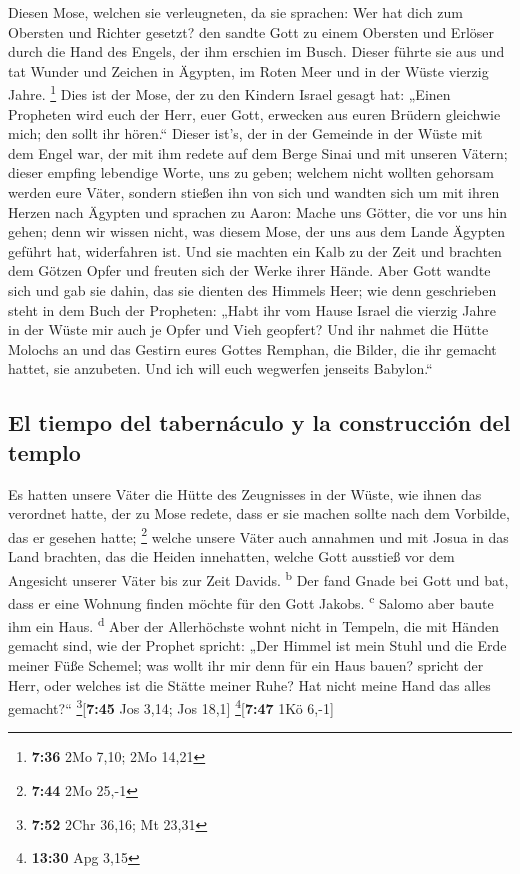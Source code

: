  Diesen Mose, welchen sie verleugneten, da sie sprachen:
Wer hat dich zum Obersten und Richter gesetzt? den sandte Gott zu einem
Obersten und Erlöser durch die Hand des Engels, der ihm erschien im
Busch.  Dieser führte sie aus und tat Wunder und Zeichen
in Ägypten, im Roten Meer und in der Wüste vierzig Jahre. \footnote{\textbf{7:36}
  2Mo 7,10; 2Mo 14,21}  Dies ist der Mose, der zu den
Kindern Israel gesagt hat: „Einen Propheten wird euch der Herr, euer
Gott, erwecken aus euren Brüdern gleichwie mich; den sollt ihr hören.``
 Dieser ist's, der in der Gemeinde in der Wüste mit dem
Engel war, der mit ihm redete auf dem Berge Sinai und mit unseren
Vätern; dieser empfing lebendige Worte, uns zu geben; 
welchem nicht wollten gehorsam werden eure Väter, sondern stießen ihn
von sich und wandten sich um mit ihren Herzen nach Ägypten
 und sprachen zu Aaron: Mache uns Götter, die vor uns hin
gehen; denn wir wissen nicht, was diesem Mose, der uns aus dem Lande
Ägypten geführt hat, widerfahren ist.  Und sie machten
ein Kalb zu der Zeit und brachten dem Götzen Opfer und freuten sich der
Werke ihrer Hände.  Aber Gott wandte sich und gab sie
dahin, das sie dienten des Himmels Heer; wie denn geschrieben steht in
dem Buch der Propheten: „Habt ihr vom Hause Israel die vierzig Jahre in
der Wüste mir auch je Opfer und Vieh geopfert?  Und ihr
nahmet die Hütte Molochs an und das Gestirn eures Gottes Remphan, die
Bilder, die ihr gemacht hattet, sie anzubeten. Und ich will euch
wegwerfen jenseits Babylon.``

\hypertarget{el-tiempo-del-tabernuxe1culo-y-la-construcciuxf3n-del-templo}{%
\subsection{El tiempo del tabernáculo y la construcción del
templo}\label{el-tiempo-del-tabernuxe1culo-y-la-construcciuxf3n-del-templo}}

 Es hatten unsere Väter die Hütte des Zeugnisses in der
Wüste, wie ihnen das verordnet hatte, der zu Mose redete, dass er sie
machen sollte nach dem Vorbilde, das er gesehen hatte; \footnote{\textbf{7:44}
  2Mo 25,-1}  welche unsere Väter auch annahmen und mit
Josua in das Land brachten, das die Heiden innehatten, welche Gott
ausstieß vor dem Angesicht unserer Väter bis zur Zeit Davids.
\textsuperscript{b}  Der fand Gnade bei Gott und bat,
dass er eine Wohnung finden möchte für den Gott Jakobs.
\textsuperscript{c}  Salomo aber baute ihm ein Haus.
\textsuperscript{d}  Aber der Allerhöchste wohnt nicht in
Tempeln, die mit Händen gemacht sind, wie der Prophet spricht:
 „Der Himmel ist mein Stuhl und die Erde meiner Füße
Schemel; was wollt ihr mir denn für ein Haus bauen? spricht der Herr,
oder welches ist die Stätte meiner Ruhe?  Hat nicht meine
Hand das alles gemacht?{}`` \footnote{\textbf{7:52} 2Chr 36,16; Mt 23,31}{[}\textbf{7:45}
Jos 3,14; Jos 18,1{]} \footnote{\textbf{13:30} Apg 3,15}{[}\textbf{7:47}
1Kö 6,-1{]}

